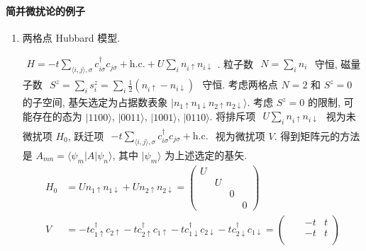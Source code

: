 \documentclass[../../main.tex]{subfiles}
\begin{document}
\paragraph{简并微扰论的例子}
\begin{enumerate}
    \item 两格点 Hubbard 模型. 
    
    $\begin{aligned}
        H = -t\sum_{\langle i,j\rangle,\sigma}c^{\dagger}_{i\sigma}c_{j\sigma} + \text{h.c.} + U\sum_{i}n_{i\uparrow}n_{i\downarrow}
    \end{aligned}$. 粒子数 $\begin{aligned}
        N = \sum_{i}n_{i}
    \end{aligned}$ 守恒, 磁量子数 $\begin{aligned}
        S^{z} = \sum_{i}s_{i}^{z} = \sum_{i}\frac{1}{2}(n_{i\uparrow}-n_{i\downarrow})
    \end{aligned}$ 守恒. 考虑两格点 $N = 2$ 和 $S^{z}=0$ 的子空间, 基矢选定为占据数表象 $|n_{1\uparrow}n_{1\downarrow}n_{2\uparrow}n_{2\downarrow}\rangle$. 考虑 $S^{z}=0$ 的限制, 可能存在的态为 $|1100\rangle$, $|0011\rangle$, $|1001\rangle$, $|0110\rangle$. 将排斥项 $\begin{aligned}
        U\sum_{i}n_{i\uparrow}n_{i\downarrow}
    \end{aligned}$ 视为未微扰项 $H_{0}$, 跃迁项 $\begin{aligned}
        -t\sum_{\langle i,j\rangle,\sigma}c^{\dagger}_{i\sigma}c_{j\sigma} + \text{h.c.}
    \end{aligned}$ 视为微扰项 $V$. 得到矩阵元的方法是 $A_{mn} = \langle \psi_{m}|A|\psi_{n}\rangle$, 其中 $|\psi_{m}\rangle$ 为上述选定的基矢. 
    \begin{align*}
        H_{0} &= Un_{1\uparrow}n_{1\downarrow} + Un_{2\uparrow}n_{2\downarrow}
        = \begin{pmatrix}
            U & & & \\
            & U & & \\
            & & 0 & \\
            & & & 0
        \end{pmatrix}\\
        V &= -tc_{1\uparrow}^{\dagger}c_{2\uparrow} - tc_{2\uparrow}^{\dagger}c_{1\uparrow} - tc_{1\downarrow}^{\dagger}c_{2\downarrow} - tc_{2\downarrow}^{\dagger}c_{1\downarrow} = \begin{pmatrix}
            & & -t & t\\
            & & -t & t\\

\end{pmatrix}
\end{align*}
\end{enumerate}
\end{document}
